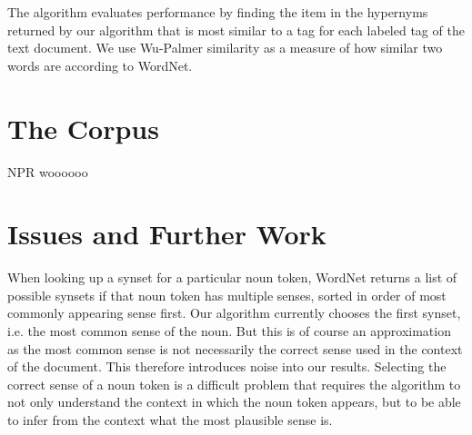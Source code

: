 \documentclass[11pt]{article}
\begin{document}
The algorithm evaluates performance by finding the item in the hypernyms returned by our algorithm that is most similar to a tag for each labeled tag of the text document. We use Wu-Palmer similarity as a measure of how similar two words are according to WordNet.

\section{The Corpus}

NPR woooooo

\section{Issues and Further Work}

When looking up a synset for a particular noun token, WordNet returns a list of possible synsets if that noun token has multiple senses, sorted in order of most commonly appearing sense first. Our algorithm currently chooses the first synset, i.e. the most common sense of the noun. But this is of course an approximation as the most common sense is not necessarily the correct sense used in the context of the document. This therefore introduces noise into our results. Selecting the correct sense of a noun token is a difficult problem that requires the algorithm to not only understand the context in which the noun token appears, but to be able to infer from the context what the most plausible sense is.



%
%


\end{document}
